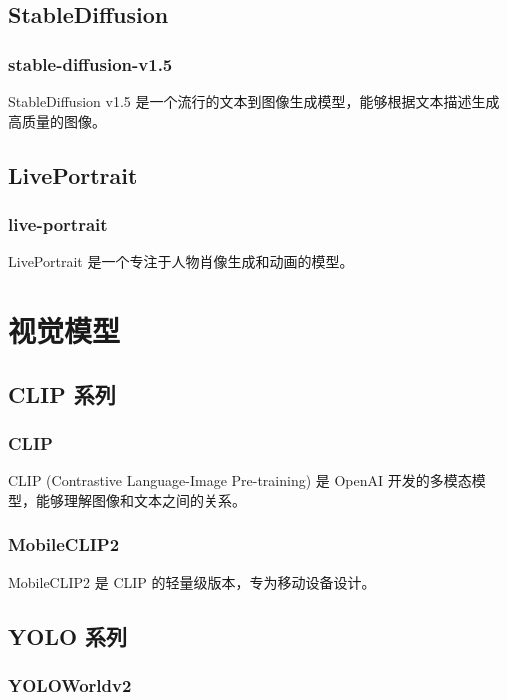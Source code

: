 \documentclass[12pt,UTF8]{ctexbook}
\begin{document}
\section{StableDiffusion}

\subsection{stable-diffusion-v1.5}

StableDiffusion v1.5 是一个流行的文本到图像生成模型，能够根据文本描述生成高质量的图像。

\section{LivePortrait}

\subsection{live-portrait}

LivePortrait 是一个专注于人物肖像生成和动画的模型。

\chapter{视觉模型}

\section{CLIP 系列}

\subsection{CLIP}

CLIP (Contrastive Language-Image Pre-training) 是 OpenAI 开发的多模态模型，能够理解图像和文本之间的关系。

\subsection{MobileCLIP2}

MobileCLIP2 是 CLIP 的轻量级版本，专为移动设备设计。

\section{YOLO 系列}

\subsection{YOLOWorldv2}
\end{document}
